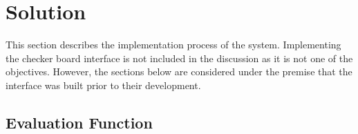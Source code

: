 \documentclass[12pt,a4paper]{article}
\begin{document}
\section{Solution}


        
    This section describes the implementation process of the system. Implementing the checker board interface is not included in the discussion as it is not one of the objectives. However, the sections below are considered under the premise that the interface was built prior to their development.

    \subsection{Evaluation Function}
        
\end{document}
